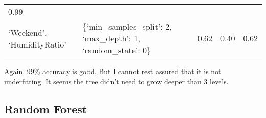 \documentclass[11pt]{article}
\begin{document}
\begin{longtable}[]{@{}lllll@{}}
\begin{minipage}[t]{0.05\columnwidth}
0.99\strut
\end{minipage}\tabularnewline
\begin{minipage}[t]{0.29\columnwidth}\raggedright
`Weekend', `HumidityRatio'\strut
\end{minipage} & \begin{minipage}[t]{0.41\columnwidth}\raggedright
\{`min\_samples\_split': 2, `max\_depth': 1, `random\_state': 0\}\strut
\end{minipage} & \begin{minipage}[t]{0.05\columnwidth}\raggedright
0.62\strut
\end{minipage} & \begin{minipage}[t]{0.05\columnwidth}\raggedright
0.40\strut
\end{minipage} & \begin{minipage}[t]{0.05\columnwidth}\raggedright
0.62\strut
\end{minipage}\tabularnewline
\bottomrule
\end{longtable}

    Again, 99\% accuracy is good. But I cannot rest assured that it is not
underfitting. It seems the tree didn't need to grow deeper than 3
levels.

    \hypertarget{random-forest}{%
\subsection{Random Forest}\label{random-forest}}
\end{document}

